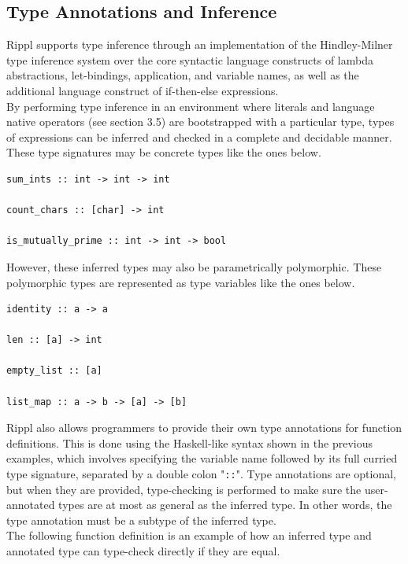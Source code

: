\documentclass[5pt]{article}
\begin{document}
\subsection{Type Annotations and Inference}
Rippl supports type inference through an implementation of the Hindley-Milner type inference system over the core syntactic language constructs of lambda abstractions, let-bindings, application, and variable names, as well as the additional language construct of if-then-else expressions. \\

\noindent By performing type inference in an environment where literals and language native operators (see section 3.5) are bootstrapped  with a particular type, types of expressions can be inferred and checked in a complete and decidable manner. These type signatures may be concrete types like the ones below.

\begin{lstlisting}[language=rippl]
sum_ints :: int -> int -> int

count_chars :: [char] -> int

is_mutually_prime :: int -> int -> bool
\end{lstlisting}

\noindent However, these inferred types may also be parametrically polymorphic. These polymorphic types are represented as type variables like the ones below. \\

\begin{lstlisting}[language=rippl]
identity :: a -> a

len :: [a] -> int

empty_list :: [a]

list_map :: a -> b -> [a] -> [b]
\end{lstlisting}

\noindent Rippl also allows programmers to provide their own type annotations for function definitions. This is done using the Haskell-like syntax shown in the previous examples, which involves specifying the variable name followed by its full curried type signature, separated by a double colon "\texttt{::}". Type annotations are optional, but when they are provided, type-checking is performed to make sure the user-annotated types are at most as general as the inferred type. In other words, the type annotation must be a subtype of the inferred type. \\

\noindent The following function definition is an example of how an inferred type and annotated type can type-check directly if they are equal. \\
\end{document}
